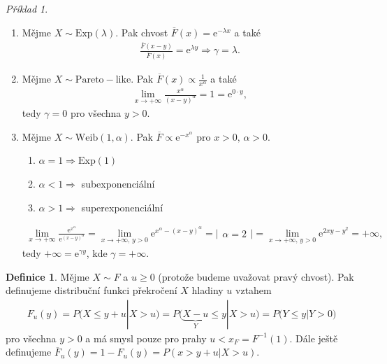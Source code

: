 \documentclass{article}
\theoremstyle{remark}
\theoremstyle{plain}
\theoremstyle{definition}
\newtheorem{definition}[subsubsection]{Definice}
\theoremstyle{remark}
\newtheorem*{example}{Příklad}
\begin{document}
\begin{example}
\begin{enumerate}
    \item Mějme $X\sim\mathrm{Exp}(\lambda)$. Pak chvost $\overline{F}(x)=\mathrm{e}^{-\lambda x}$ a také
\begin{align*}
    \frac{\overline{F}(x-y)}{\overline{F}(x)}=\mathrm{e}^{\lambda y}\Rightarrow \gamma=\lambda.
\end{align*}
\item Mějme $X\sim\mathrm{Pareto-like}$. Pak $\overline{F}(x)\propto\frac{1}{x^\alpha}$ a také
\begin{align*}
    \lim_{x\rightarrow +\infty}\frac{x^\alpha}{(x-y)^\alpha}=1=\mathrm{e}^{0\cdot y},
\end{align*}
tedy $\gamma=0$ pro všechna $y>0$.
\item Mějme $X\sim\mathrm{Weib}(1,\alpha)$. Pak $\overline{F}\propto\mathrm{e}^{-x^\alpha}$ pro $x>0,\,\alpha>0$.
\begin{enumerate}
    \item $\alpha=1\Rightarrow \mathrm{Exp}(1)$
    \item $\alpha<1\Rightarrow$ subexponenciální
    \item $\alpha>1\Rightarrow$ superexponenciální
\end{enumerate}
\begin{align*}
    \lim_{x\rightarrow +\infty}\frac{\mathrm{e}^{x^\alpha}}{\mathrm{e}^{(x-y)^\alpha}}=\lim_{x\rightarrow +\infty,\,y>0}\mathrm{e}^{x^\alpha-(x-y)^\alpha}=\Big|\begin{array}{c}
    \alpha=2
    \end{array}\Big|=
    \lim_{x\rightarrow +\infty,\,y>0}\mathrm{e}^{2xy-y^2}=+\infty,
\end{align*}
tedy $+\infty=\mathrm{e}^{\gamma y}$, kde $\gamma=+\infty$.
\end{enumerate}
\end{example}

\begin{definition}
Mějme $X\sim F$ a $u\geq 0$ (protože budeme uvažovat pravý chvost). Pak definujeme distribuční funkci překročení $X$ hladiny $u$ vztahem
\begin{align*}
    F_u(y)=P\big(X\leq y+u|X>u\big)=P\big(\underbrace{X-u}_{Y}\leq y|X>u\big)=P\big(Y\leq y|Y>0\big)
\end{align*}
pro všechna $y>0$ a má smysl pouze pro prahy $u<x_F=F^{-1}(1)$. Dále ještě definujeme $\overline{F}_u(y)=1-F_u(y)=P(x>y+u|X>u)$.
\end{definition}
\end{document}
